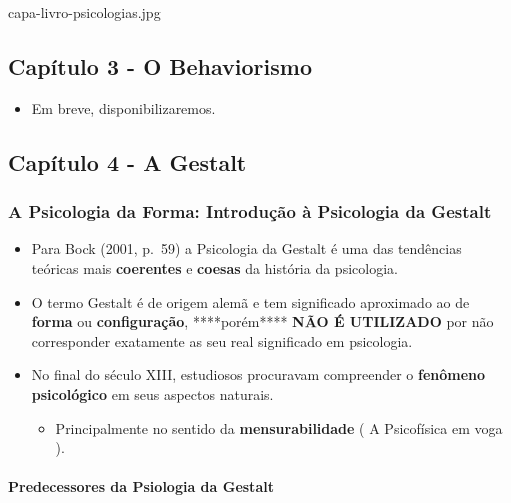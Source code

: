 \documentclass[
]{book}
\providecommand{\tightlist}{%
  \setlength{\itemsep}{0pt}\setlength{\parskip}{0pt}}
\begin{document}
capa-livro-psicologias.jpg

\hypertarget{capuxedtulo-3---o-behaviorismo}{%
\subsection{Capítulo 3 - O Behaviorismo}\label{capuxedtulo-3---o-behaviorismo}}

\begin{itemize}
\tightlist
\item
  Em breve, disponibilizaremos.
\end{itemize}

\hypertarget{capuxedtulo-4---a-gestalt}{%
\subsection{Capítulo 4 - A Gestalt}\label{capuxedtulo-4---a-gestalt}}

\hypertarget{a-psicologia-da-forma-introduuxe7uxe3o-uxe0-psicologia-da-gestalt}{%
\subsubsection{A Psicologia da Forma: Introdução à Psicologia da Gestalt}\label{a-psicologia-da-forma-introduuxe7uxe3o-uxe0-psicologia-da-gestalt}}

\begin{itemize}
\tightlist
\item
  Para Bock (2001, p.~59) a Psicologia da Gestalt é uma das tendências teóricas mais \textbf{coerentes} e \textbf{coesas} da história da psicologia.
\item
  O termo Gestalt é de origem alemã e tem significado aproximado ao de \textbf{forma} ou \textbf{configuração}, ****porém**** \textbf{NÃO É UTILIZADO} por não corresponder exatamente as seu real significado em psicologia.
\item
  No final do século XIII, estudiosos procuravam compreender o \textbf{fenômeno psicológico} em seus aspectos naturais.

  \begin{itemize}
  \tightlist
  \item
    Principalmente no sentido da \textbf{mensurabilidade} ( A Psicofísica em voga ).
  \end{itemize}
\end{itemize}

\hypertarget{predecessores-da-psiologia-da-gestalt}{%
\paragraph{Predecessores da Psiologia da Gestalt}\label{predecessores-da-psiologia-da-gestalt}}
\end{document}

